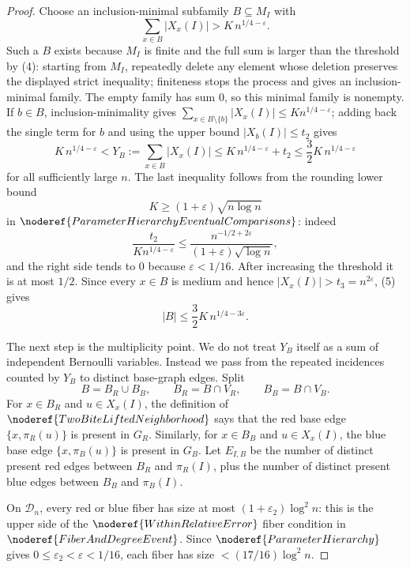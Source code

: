 \begin{proof}
Choose an inclusion-minimal subfamily \(B\subseteq M_I\) with
\[
\sum_{x\in B}|X_x(I)|>K\,n^{1/4-\varepsilon}.
\]
Such a \(B\) exists because \(M_I\) is finite and the full sum is larger than
the threshold by (4): starting from \(M_I\), repeatedly delete any element
whose deletion preserves the displayed strict inequality; finiteness stops the
process and gives an inclusion-minimal family.  The empty family has sum
\(0\), so this minimal family is nonempty.  If \(b\in B\), inclusion-minimality
gives
\(\sum_{x\in B\setminus\{b\}}|X_x(I)|\le K n^{1/4-\varepsilon}\); adding back
the single term for \(b\) and using the upper bound \(|X_b(I)|\le t_2\) gives
\[
K\,n^{1/4-\varepsilon}
<Y_B:=\sum_{x\in B}|X_x(I)|
\le K\,n^{1/4-\varepsilon}+t_2
\le \frac32K\,n^{1/4-\varepsilon} \tag{5}
\]
for all sufficiently large \(n\).  The last inequality follows from the
rounding lower bound
\[
K\ge (1+\varepsilon)\sqrt{n\log n}
\]
in \(\noderef{ParameterHierarchyEventualComparisons}\): indeed
\[
\frac{t_2}{K n^{1/4-\varepsilon}}
\le
\frac{n^{-1/2+2\varepsilon}}{(1+\varepsilon)\sqrt{\log n}},
\]
and the right side tends to \(0\) because
\(\varepsilon<1/16\).  After increasing the threshold it is at most \(1/2\).
Since every \(x\in B\) is medium and hence
\(|X_x(I)|>t_3=n^{2\varepsilon}\), (5) gives
\[
|B|\le \frac32K\,n^{1/4-3\varepsilon}. \tag{6}
\]

The next step is the multiplicity point.  We do not treat \(Y_B\) itself as a
sum of independent Bernoulli variables.  Instead we pass from the repeated
incidences counted by \(Y_B\) to distinct base-graph edges.  Split
\[
B=B_R\cup B_B,\qquad B_R=B\cap V_R,\qquad B_B=B\cap V_B.
\]
For \(x\in B_R\) and \(u\in X_x(I)\), the definition of
\(\noderef{TwoBiteLiftedNeighborhood}\) says that the red base edge
\(\{x,\pi_R(u)\}\) is present in \(G_R\).  Similarly, for \(x\in B_B\) and
\(u\in X_x(I)\), the blue base edge \(\{x,\pi_B(u)\}\) is present in \(G_B\).
Let \(E_{I,B}\) be the number of distinct present red edges between
\(B_R\) and \(\pi_R(I)\), plus the number of distinct present blue edges
between \(B_B\) and \(\pi_B(I)\).

On \(\mathcal D_n\), every red or blue fiber has size at most
\((1+\varepsilon_2)\log^2 n\): this is the upper side of the
\(\noderef{WithinRelativeError}\) fiber condition in
\(\noderef{FiberAndDegreeEvent}\).  Since
\(\noderef{ParameterHierarchy}\) gives
\(0\le\varepsilon_2<\varepsilon<1/16\), each fiber has size
\(<(17/16)\log^2 n\).


\end{proof}

